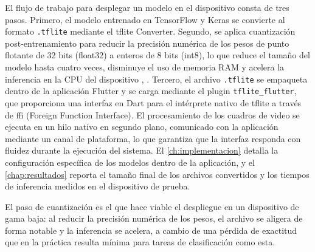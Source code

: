 El flujo de trabajo para desplegar un modelo en el dispositivo consta de tres pasos.
Primero, el modelo entrenado en TensorFlow y Keras se convierte al formato \texttt{.tflite}
mediante el \acrshort{tflite} Converter. Segundo, se aplica cuantización post-entrenamiento para
reducir la precisión numérica de los pesos de punto flotante de 32 bits (float32) a
enteros de 8 bits (int8), lo que reduce el tamaño del modelo hasta cuatro veces,
disminuye el uso de memoria RAM y acelera la inferencia en la CPU del dispositivo
\cite{google_tflite_2024}, \cite{google_quantization_2024}. Tercero, el archivo
\texttt{.tflite} se empaqueta dentro de la aplicación Flutter y se carga mediante el
plugin \texttt{tflite\_flutter}, que proporciona una interfaz en Dart para el intérprete
nativo de \acrshort{tflite} a través de \acrshort{ffi} (Foreign Function Interface). El procesamiento de los cuadros de video se
ejecuta en un hilo nativo en segundo plano, comunicado con la aplicación mediante un canal
de plataforma, lo que garantiza que la interfaz responda con fluidez durante la ejecución
del sistema.
El \autoref{ch:implementacion} detalla la configuración específica de los modelos dentro
de la aplicación, y el \autoref{chap:resultados} reporta el tamaño final de los archivos
convertidos y los tiempos de inferencia medidos en el dispositivo de prueba.

El paso de cuantización es el que hace viable el despliegue en un dispositivo de gama
baja: al reducir la precisión numérica de los pesos, el archivo se aligera de forma
notable y la inferencia se acelera, a cambio de una pérdida de exactitud que en la
práctica resulta mínima para tareas de clasificación como esta.
